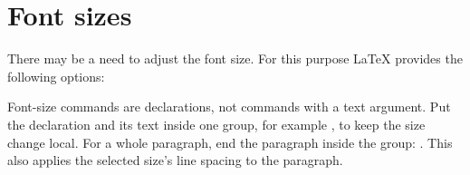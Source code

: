 
\section{Font sizes}
\label{sec:Font sizes}

There may be a need to adjust the font size. For this purpose \LaTeX{} provides
the following options:

Font-size commands are declarations, not commands with a text argument.
Put the declaration and its text inside one group, for example
, to keep the size change local.
For a whole paragraph, end the paragraph inside the group:
.
This also applies the selected size's line spacing to the paragraph.

